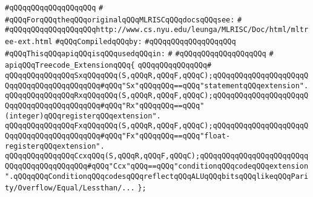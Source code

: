 \verb|#qQQqqQQqqQQqqQQqqQQq|\newline
\verb|#|\newline
\verb|#qQQqForqQQqtheqQQqoriginalqQQqMLRISCqQQqdocsqQQqsee:|\newline
\verb|#|\newline
\verb|#qQQqqQQqqQQqqQQqqQQqhttp://www.cs.nyu.edu/leunga/MLRISC/Doc/html/mltree-ext.html|\newline
\newline
\verb|#qQQqCompiledqQQqby:|\newline
\verb|#qQQqqQQqqQQqqQQqqQQq|\newline
\newline
\verb|#qQQqThisqQQqapiqQQqisqQQqusedqQQqin:|\newline
\verb|#|\newline
\verb|#qQQqqQQqqQQqqQQqqQQq|\newline
\verb|#|\newline
\verb|apiqQQqTreecode_ExtensionqQQq{|\newline
\verb|qQQqqQQqqQQqqQQq#|\newline
\verb|qQQqqQQqqQQqqQQqSxqQQqqQQq(S,qQQqR,qQQqF,qQQqC);qQQqqQQqqQQqqQQqqQQqqQQqqQQqqQQqqQQqqQQqqQQq#qQQq"Sx"qQQqqQQq==qQQq"statementqQQqextension".|\newline
\verb|qQQqqQQqqQQqqQQqRxqQQqqQQq(S,qQQqR,qQQqF,qQQqC);qQQqqQQqqQQqqQQqqQQqqQQqqQQqqQQqqQQqqQQqqQQq#qQQq"Rx"qQQqqQQq==qQQq"(integer)qQQqregisterqQQqextension".|\newline
\verb|qQQqqQQqqQQqqQQqFxqQQqqQQq(S,qQQqR,qQQqF,qQQqC);qQQqqQQqqQQqqQQqqQQqqQQqqQQqqQQqqQQqqQQqqQQq#qQQq"Fx"qQQqqQQq==qQQq"float-registerqQQqextension".|\newline
\verb|qQQqqQQqqQQqqQQqCcxqQQq(S,qQQqR,qQQqF,qQQqC);qQQqqQQqqQQqqQQqqQQqqQQqqQQqqQQqqQQqqQQqqQQq#qQQq"Ccx"qQQq==qQQq"conditionqQQqcodeqQQqextension".qQQqqQQqConditionqQQqcodesqQQqreflectqQQqALUqQQqbitsqQQqlikeqQQqParity/Overflow/Equal/Lessthan/...|\newline
\verb|};|\newline

